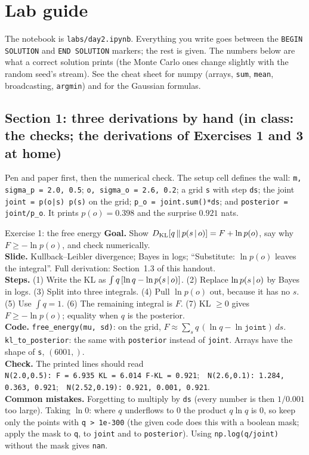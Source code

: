 \documentclass[11pt]{article}
\begin{document}
\section{Lab guide}

The notebook is \texttt{labs/day2.ipynb}. Everything you write goes between the \texttt{BEGIN SOLUTION} and \texttt{END SOLUTION} markers; the rest is given. The numbers below are what a correct solution prints (the Monte Carlo ones change slightly with the random seed's stream). See the cheat sheet for numpy (arrays, \texttt{sum}, \texttt{mean}, broadcasting, \texttt{argmin}) and for the Gaussian formulas.

\subsection*{Section 1: three derivations by hand (in class: the checks; the derivations of Exercises 1 and 3 at home)}
Pen and paper first, then the numerical check. The setup cell defines the wall: \texttt{m, sigma\_p = 2.0, 0.5}; \texttt{o, sigma\_o = 2.6, 0.2}; a grid \texttt{s} with step \texttt{ds}; the joint \texttt{joint = p(o|s) p(s)} on the grid; \texttt{p\_o = joint.sum()*ds}; and \texttt{posterior = joint/p\_o}. It prints $p(o) = 0.398$ and the surprise $0.921$ nats.

\begin{labhelp}{Exercise 1: the free energy}
\textbf{Goal.} Show $D_{\mathrm{KL}}\!\left[q\,\middle\|\,p(s\,|\, o)\right] = F + \ln p(o)$, say why $F\ge -\ln p(o)$, and check numerically.\\
\textbf{Slide.} Kullback--Leibler divergence; Bayes in logs; ``Substitute: $\ln p(o)$ leaves the integral''. Full derivation: Section~1.3 of this handout.\\
\textbf{Steps.} (1) Write the KL as $\int q\,[\ln q - \ln p(s\,|\, o)]$. (2) Replace $\ln p(s\,|\, o)$ by Bayes in logs. (3) Split into three integrals. (4) Pull $\ln p(o)$ out, because it has no $s$. (5) Use $\int q = 1$. (6) The remaining integral is $F$. (7) KL $\ge0$ gives $F\ge-\ln p(o)$; equality when $q$ is the posterior.\\
\textbf{Code.} \texttt{free\_energy(mu, sd)}: on the grid, $F\approx\sum_s q\,(\ln q - \ln \texttt{joint})\,ds$. \texttt{kl\_to\_posterior}: the same with \texttt{posterior} instead of \texttt{joint}. Arrays have the shape of \texttt{s}, $(6001,)$.\\
\textbf{Check.} The printed lines should read\\
\texttt{N(2.0,0.5): F = 6.935 KL = 6.014 F-KL = 0.921};\ \ \texttt{N(2.6,0.1): 1.284, 0.363, 0.921};\ \ \texttt{N(2.52,0.19): 0.921, 0.001, 0.921}.\\
\textbf{Common mistakes.} Forgetting to multiply by \texttt{ds} (every number is then $1/0.001$ too large). Taking $\ln 0$: where $q$ underflows to $0$ the product $q\ln q$ is $0$, so keep only the points with \texttt{q > 1e-300} (the given code does this with a boolean mask; apply the mask to \texttt{q}, to \texttt{joint} and to \texttt{posterior}). Using \texttt{np.log(q/joint)} without the mask gives \texttt{nan}.
\end{labhelp}
\end{document}
